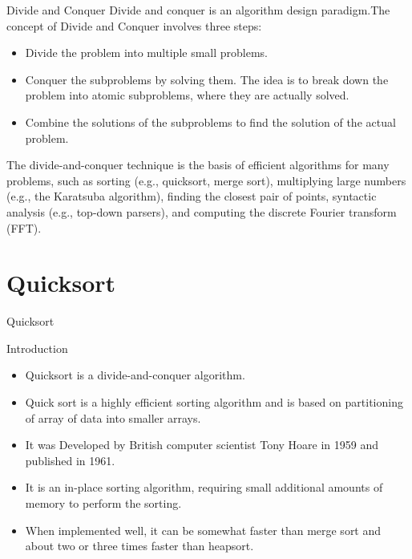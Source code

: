 \documentclass{beamer}
\begin{document}
\begin{frame}{Divide and Conquer}
		Divide and conquer is an algorithm design paradigm.The concept of Divide and Conquer involves three steps:\pause
		\begin{itemize}
			\item	Divide the problem into multiple small problems.\pause
			\item  	Conquer the subproblems by solving them. The idea is to break down the problem into atomic subproblems, where they are actually solved.\pause
			\item   Combine the solutions of the subproblems to find the solution of the actual problem.\pause
		\end{itemize}
	    \begin{examples}
	    The divide-and-conquer technique is the basis of efficient algorithms for many problems, such as sorting (e.g., quicksort, merge sort), multiplying large numbers (e.g., the Karatsuba algorithm), finding the closest pair of points, syntactic analysis (e.g., top-down parsers), and computing the discrete Fourier transform (FFT).
	    \end{examples}   
\end{frame}

\section{Quicksort}

 \begin{frame}{Quicksort}
 	    
 	     \begin{block}{Introduction}
 		   \begin{itemize}
 		\item<2-> Quicksort is a divide-and-conquer algorithm.
 		\item<3-> Quick sort is a highly efficient sorting algorithm and is based on partitioning of array of data into smaller arrays. 
 		\item<4-> It was Developed by British computer scientist Tony Hoare in 1959 and published in 1961.
 		\item<5-> It is an in-place sorting algorithm, requiring small additional amounts of memory to perform the sorting.
 		\item<6-> When implemented well, it can be somewhat faster than merge sort and about two or three times faster than heapsort.
           \end{itemize}
        \end{block}
  
 \end{frame}
 
\end{document}
